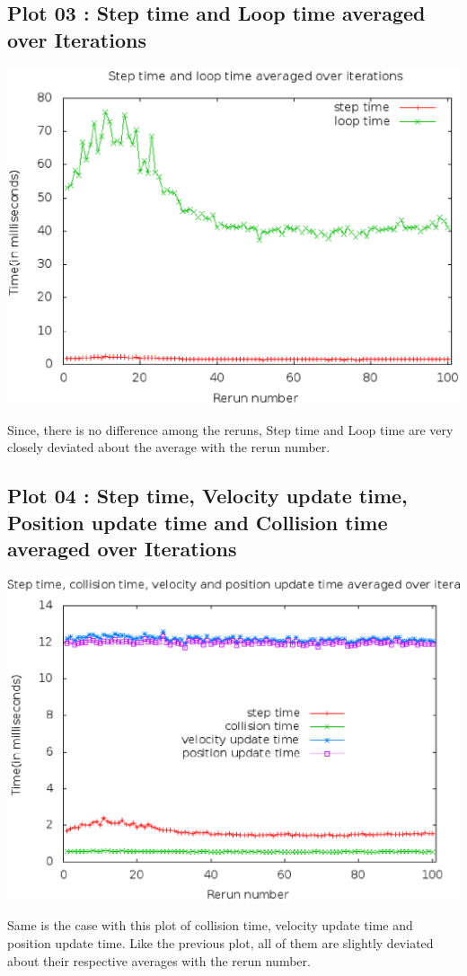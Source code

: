 \documentclass[11pt]{article}
\begin{document}
\subsection{Plot 03 : Step time and Loop time averaged over Iterations}
\begin{center}
\includegraphics[scale=0.5]{plot03}
\end{center}
Since, there is no difference among the reruns, Step time and Loop time are very closely deviated about the average with the rerun number.
\subsection{Plot 04 : Step time, Velocity update time, Position update time and Collision time averaged over Iterations}
\begin{center}
\includegraphics[scale=0.5]{plot04}
\end{center}
Same is the case with this plot of collision time, velocity update time and position update time. Like the previous plot, all of them are slightly deviated about their respective averages with the rerun number.
\end{document}
